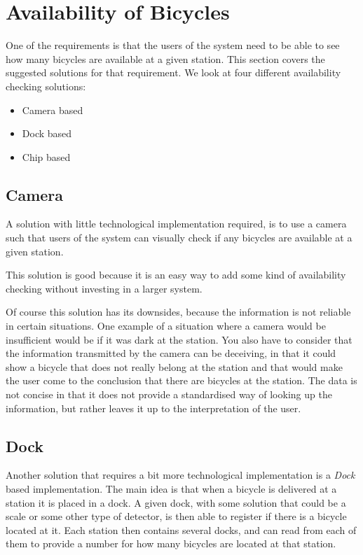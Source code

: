 \section{Availability of Bicycles}\label{sec:availability}
One of the requirements is that the users of the system need to be able to see how many bicycles are available at a given station.
This section covers the suggested solutions for that requirement.
We look at four different availability checking solutions:

\begin{itemize}
\item Camera based
\item Dock based
\item Chip based
\end{itemize} 

\subsection{Camera}
A solution with little technological implementation required, is to use a camera such that users of the system can visually check if any bicycles are available at a given station. 

This solution is good because it is an easy way to add some kind of availability checking without investing in a larger system.

Of course this solution has its downsides, because the information is not reliable in certain situations. 
One example of a situation where a camera would be insufficient would be if it was dark at the station.
You also have to consider that the information transmitted by the camera can be deceiving, in that it could show a bicycle that does not really belong at the station and that would make the user come to the conclusion that there are bicycles at the station.
The data is not concise in that it does not provide a standardised way of looking up the information, but rather leaves it up to the interpretation of the user.

\subsection{Dock}
Another solution that requires a bit more technological implementation is a \textit{Dock} based implementation.
The main idea is that when a bicycle is delivered at a station it is placed in a dock.
A given dock, with some solution that could be a scale or some other type of detector, is then able to register if there is a bicycle located at it.
Each station then contains several docks, and can read from each of them to provide a number for how many bicycles are located at that station. 

